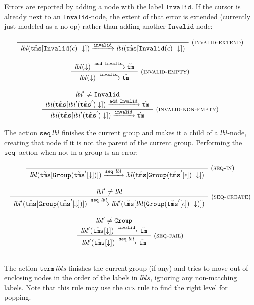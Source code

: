 \documentclass{article}
\newcommand{\rulename}{\textsc}
\newcommand{\rn}{\rulename}
\newcommand{\irule}[3]{\frac{\begin{array}{c}#2\end{array}}{\begin{array}{l}#3\end{array}}{~\small\mbox{(\rulename{#1})}}}
\newcommand{\labelFont}{\texttt}
\newcommand{\lbl}{\ensuremath{\mathit{lbl}}}
\newcommand{\lbls}{\ensuremath{\mathit{lbls}}}
\newcommand{\Group}{\ensuremath{\labelFont{Group}}}
\newcommand{\Invalid}{\ensuremath{\labelFont{Invalid}}}
\newcommand{\tm}{\ensuremath{\mathtt{tm}}}
\newcommand{\tms}{\ensuremath{\mathtt{tms}}}
\newcommand{\Tm}{\ensuremath{\check{\tm}}}
\newcommand{\Tms}{\ensuremath{\check{\tms}}}
\newcommand{\add}[1]{\ensuremath{\texttt{add}~#1}}
\newcommand{\seq}[1]{\ensuremath{\texttt{seq}~#1}}
\newcommand{\term}[1]{\ensuremath{\texttt{term}~#1}}
\newcommand{\invalid}{\ensuremath{\texttt{invalid}}}
\newcommand{\cursor}{\ensuremath{\downarrow}}
\newcommand{\steps}[1]{\ensuremath{\xrightarrow{#1}}}
\begin{document}
Errors are reported by adding a node with the label \Invalid. If
the cursor is already next to an \Invalid-node, the extent of
that error is extended (currently just modeled as a no-op) rather
than adding another \Invalid-node:

\[
  \begin{array}{c}
    \irule{invalid-extend}{}{
    \lbl(\Tms[\Invalid(\epsilon)~\cursor]) \steps{\invalid}
    \lbl(\Tms[\Invalid(\epsilon)~\cursor])
    }
    \\\\

    \irule{invalid-empty}{
    \lbl(\cursor) \steps{\add{\Invalid}} \Tm
    }{
    \lbl(\cursor) \steps{\invalid} \Tm
    }
    \\\\

    \irule{invalid-non-empty}{
    \lbl' \neq \Invalid\\
    \lbl(\Tms[\lbl'(\Tms') \cursor]) \steps{\add{\Invalid}} \Tm
    }{
    \lbl(\Tms[\lbl'(\Tms') \cursor]) \steps{\invalid} \Tm
    }
  \end{array}
\]

The action \seq{\lbl} finishes the current group and makes it a
child of a \lbl-node, creating that node if it is not the parent
of the current group. Performing the \seq{}-action when not in a
group is an error:

\[
  \begin{array}{c}
    \irule{seq-in}{}{
    \lbl(\Tms[\Group(\Tms'[\cursor])]) \steps{\seq{\lbl}}
    \lbl(\Tms[\Group(\Tms'[\epsilon])~\cursor])
    }\\\\
    \irule{seq-create}{
    \lbl' \neq \lbl
    }{
    \lbl'(\Tms[\Group(\Tms'[\cursor])]) \steps{\seq{\lbl}}
    \lbl'(\Tms[\lbl(\Group(\Tms'[\epsilon])~\cursor)])
    }\\\\
    \irule{seq-fail}{
    \lbl' \neq \Group\\
    \lbl'(\Tms[\cursor]) \steps{\invalid{}} \Tm{}
    }{
    \lbl'(\Tms[\cursor]) \steps{\seq{\lbl}} \Tm{}
    }\\\\
  \end{array}
\]

The action \term{\lbls} finishes the current group (if any) and
tries to move out of enclosing nodes in the order of the labels in
\lbls, ignoring any non-matching labels. Note that this rule may
use the \rn{ctx} rule to find the right level for popping.
\end{document}
